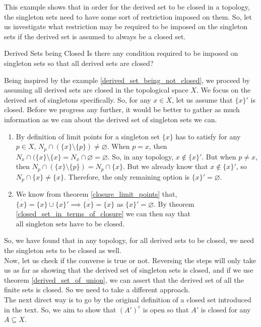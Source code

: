 \noindent This example shows that in order for the derived set to be closed in a topology, the singleton sets need to have some sort of restriction imposed on them. So, let us investigate what restriction may be required to be imposed on the singleton sets if the derived set is assumed to always be a closed set.
\begin{Query}{Derived Sets being Closed}\label{derived_set_being_closed_investigation}
    Is there any condition required to be imposed on singleton sets so that all derived sets are closed?
\end{Query}
\begin{Investigation}
    Being inspired by the example \eqref{derived_set_being_not_closed}, we proceed by assuming all derived sets are closed in the topological space $X$. We focus on the derived set of singletons specifically. So, for any $x\in X$, let us assume that $\{x\}'$ is closed. Before we progress any further, it would be better to gather as much information as we can about the derived set of singleton sets we can. 
    \begin{enumerate}
        \item By definition of limit points for a singleton set $\{x\}$ has to satisfy for any $p\in X$, $N_p\cap(\{x\}\setminus\{p\})\neq\varnothing$. When $p=x$, then $N_x\cap(\{x\}\setminus\{x\}=N_x\cap\varnothing=\varnothing$. So, in any topology, $x\notin\{x\}'$. But when $p\neq x$, then $N_p\cap(\{x\}\setminus\{p\})=N_p\cap\{x\}$. But we already know that $x\notin\{x\}'$, so $N_p\cap\{x\}\neq\{x\}$. Therefore, the only remaining option is $\boxed{\{x\}'=\varnothing}$.
        \item We know from theorem \eqref{closure_limit_points} that, $\overline{\{x\}}=\{x\}\cup\{x\}'\implies\overline{\{x\}}=\{x\}$ as $\{x\}'=\varnothing$. By theorem \eqref{closed_set_in_terms_of_closure} we can then say that $\boxed{\text{all singleton sets have to be closed}}$.
    \end{enumerate}
    So, we have found that in any topology, for all derived sets to be closed, we need the singleton sets to be closed as well.\\
    Now, let us check if the converse is true or not. Reversing the steps will only take us as far as showing that the derived set of singleton sets is closed, and if we use theorem \eqref{derived_set_of_union}, we can assert that the derived set of all the finite sets is closed. So we need to take a different approach.\\
    The next direct way is to go by the original definition of a closed set introduced in the text. So, we aim to show that $(A')^c$ is open so that $A'$ is closed for any $A\subseteq X$.\\

\end{Investigation}
